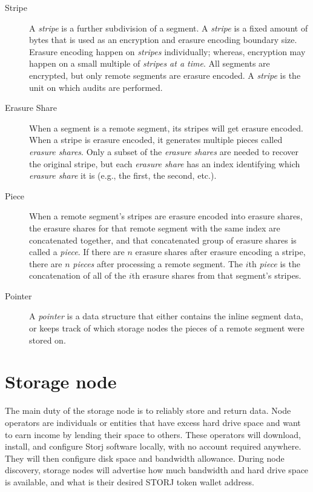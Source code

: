 \documentclass[11pt,fleqn,openany]{book}
\begin{document}
\begin{description}
\item[Stripe] A {\em stripe} is a further subdivision of a segment. A
{\em stripe} is a fixed amount of bytes that is used as an encryption and erasure
encoding boundary size. Erasure encoding happen on {\em stripes} individually; 
whereas, encryption may happen on a small multiple of {\em stripes at a time}. All
segments are encrypted, but only remote segments are erasure encoded.
A {\em stripe} is the unit on which audits are performed.

\item[Erasure Share] When a segment is a remote segment, its stripes
will get erasure encoded. When a stripe is erasure encoded, it generates
multiple pieces called {\em erasure shares}. Only a subset of the {\em erasure
shares} are needed to recover the original stripe, but each {\em erasure
share} has an index identifying which {\em erasure share} it is (e.g., the first,
the second, etc.).

\item[Piece] When a remote segment's stripes are erasure encoded into
erasure shares, the erasure shares for that remote segment with the
same index are concatenated together, and that concatenated group of erasure
shares is called a {\em piece}. If there are $n$ erasure shares after erasure
encoding a stripe, there are $n$ {\em pieces} after processing a remote
segment. The $i$th {\em piece} is the concatenation of all of the $i$th
erasure shares from that segment's stripes.

\item[Pointer] A {\em pointer} is a data structure that either contains the
inline segment data, or keeps track of which
storage nodes the pieces of a remote segment were stored on.
\end{description}

\section{Storage node}

The main duty of the storage node is to reliably store and return data.
Node operators
are individuals or entities that have excess hard drive space and want to earn
income by lending their space to others. These operators will
download,
install, and configure Storj software locally, with no account required
anywhere. They will then configure disk space and bandwidth allowance.
During node discovery, storage nodes will advertise how much bandwidth and
hard drive space is available, and what is their desired STORJ token
wallet address.
\end{document}
